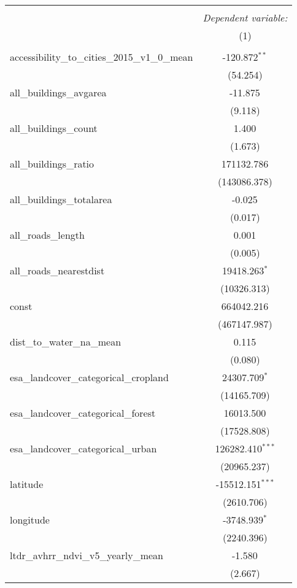 \begin{table}[!htbp] \centering
\begin{tabular}{@{\extracolsep{5pt}}lc}
\\[-1.8ex]\hline
\hline \\[-1.8ex]
& \multicolumn{1}{c}{\textit{Dependent variable:}} \
\cr \cline{1-2}
\\[-1.8ex] & (1) \\
\hline \\[-1.8ex]
 accessibility_to_cities_2015_v1_0_mean & -120.872$^{**}$ \\
  & (54.254) \\
 all_buildings_avgarea & -11.875$^{}$ \\
  & (9.118) \\
 all_buildings_count & 1.400$^{}$ \\
  & (1.673) \\
 all_buildings_ratio & 171132.786$^{}$ \\
  & (143086.378) \\
 all_buildings_totalarea & -0.025$^{}$ \\
  & (0.017) \\
 all_roads_length & 0.001$^{}$ \\
  & (0.005) \\
 all_roads_nearestdist & 19418.263$^{*}$ \\
  & (10326.313) \\
 const & 664042.216$^{}$ \\
  & (467147.987) \\
 dist_to_water_na_mean & 0.115$^{}$ \\
  & (0.080) \\
 esa_landcover_categorical_cropland & 24307.709$^{*}$ \\
  & (14165.709) \\
 esa_landcover_categorical_forest & 16013.500$^{}$ \\
  & (17528.808) \\
 esa_landcover_categorical_urban & 126282.410$^{***}$ \\
  & (20965.237) \\
 latitude & -15512.151$^{***}$ \\
  & (2610.706) \\
 longitude & -3748.939$^{*}$ \\
  & (2240.396) \\
 ltdr_avhrr_ndvi_v5_yearly_mean & -1.580$^{}$ \\
  & (2.667) \\

\end{tabular}
\end{table}
